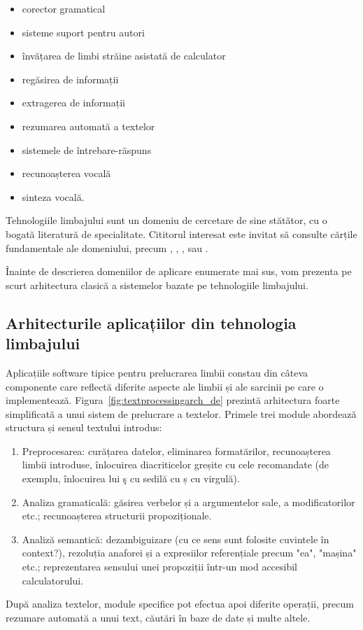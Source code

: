 \documentclass[]{../../metanetpaper}
\begin{document}
\begin{multicols}{2}
\begin{itemize}
\item corector gramatical
\item sisteme suport pentru autori
\item învățarea de limbi străine asistată de calculator
\item regăsirea de informații
\item extragerea de informații
\item rezumarea automată a textelor
\item sistemele de întrebare-răspuns
\item recunoașterea vocală
\item sinteza vocală.
\end{itemize}

Tehnologiile limbajului sunt un domeniu de cercetare de sine stătător, cu o bogată literatură de specialitate. Cititorul interesat este invitat să consulte cărțile fundamentale ale domeniului, precum \cite{carstensen-etal1}, \cite{jurafsky-martin01}, \cite{manning-schuetze1}, \cite{lt-world1} sau \cite{lt-survey1}.

Înainte de descrierea domeniilor de aplicare enumerate mai sus, vom prezenta pe scurt arhitectura clasică a sistemelor bazate pe tehnologiile limbajului.

\subsection{Arhitecturile aplicațiilor din tehnologia limbajului}

Aplicațiile software tipice pentru prelucrarea limbii constau din câteva componente care reflectă diferite aspecte ale limbii și ale sarcinii pe care o implementează. Figura~\ref{fig:textprocessingarch_de} prezintă arhitectura foarte simplificată a unui sistem de prelucrare a textelor. Primele trei module abordează structura și sensul textului introdus:

\begin{enumerate}
\item Preprocesarea: curățarea datelor, eliminarea formatărilor, recunoașterea limbii introduse, înlocuirea diacriticelor greșite cu cele recomandate (de exemplu, înlocuirea lui ş cu sedilă cu ș cu virgulă).
\item Analiza gramaticală: găsirea verbelor și a argumentelor sale, a modificatorilor etc.; recunoașterea structurii propoziționale.
\item Analiză semantică: dezambiguizare (cu ce sens sunt folosite cuvintele în context?), rezoluția anaforei și a expresiilor referențiale precum "ea", "mașina" etc.; reprezentarea sensului unei propoziții într-un mod accesibil calculatorului.
\end{enumerate}
După analiza textelor, module specifice pot efectua apoi diferite operații, precum rezumare automată a unui text, căutări în baze de date și multe altele. 


\end{multicols}
\end{document}
